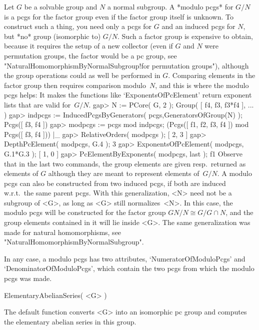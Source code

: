%
Let $G$ be  a solvable group  and $N$ a normal  subgroup. A *modulo pcgs*
for $G/N$ is a pcgs for the factor group  even if the factor group itself
is unknown. To construct such  a thing, you need only  a pcgs for $G$ and
an induced pcgs for  $N$, but *no*  group  (isomorphic to) $G/N$. Such  a
factor group is  expensive to obtain, because it  requires the setup of a
new  collector (even if $G$ and  $N$ were  permutation groups, the factor
would  be  a  pc   group,   see  "NaturalHomomorphismByNormalSubgroup!for
permutation groups"),   although the group operations  could   as well be
performed  in $G$. Comparing elements  in the  factor group then requires
comparison modulo~$N$, and this is where  the modulo pcgs helps: It makes
the functions like  `ExponentsOfPcElement' return exponent lists that are
valid for~$G/N$.
\beginexample
    gap> N := PCore( G, 2 );
    Group( [ f4, f3, f3*f4 ], ... )
    gap> indpcgs := InducedPcgsByGenerators( pcgs,GeneratorsOfGroup(N) );
    Pcgs([ f3, f4 ])
    gap> modpcgs := pcgs mod indpcgs;
    (Pcgs([ f1, f2, f3, f4 ]) mod Pcgs([ f3, f4 ]))
|_
    gap> RelativeOrders( modpcgs );
    [ 2, 3 ]
    gap> DepthPcElement( modpcgs, G.4 );
    3
    gap> ExponentsOfPcElement( modpcgs, G.1*G.3 );
    [ 1, 0 ]
    gap> PcElementByExponents( modpcgs, last );
    f1
\endexample
Observe that in  the  last two commands,   the group elements   are given
resp.\  returned as elements of $G$  although they are meant to represent
elements of~$G/N$. A modulo pcgs can also be constructed from two induced
pcgs, if   both are induced   w.r.t.\ the  same  parent  pcgs. With  this
generalization, <N> need not be  a subgroup of <G>, as  long as <G> still
normalizes~<N>. In this case, the modulo pcgs will be constructed for the
factor group $GN/N \cong G/G\cap N$,  and the group elements contained in
it  will  lie inside  <G>. The same   generalization was made for natural
homomorphisms, see "NaturalHomomorphismByNormalSubgroup".

In  any case, a  modulo pcgs  has two attributes, `NumeratorOfModuloPcgs'
and `DenominatorOfModuloPcgs', which contain the two  pcgs from which the
modulo pcgs was made.


\>ElementaryAbelianSeries( <G> )

The default  function converts   <G> into an   isomorphic pc   group  and
computes the elementary abelian series in this group.

